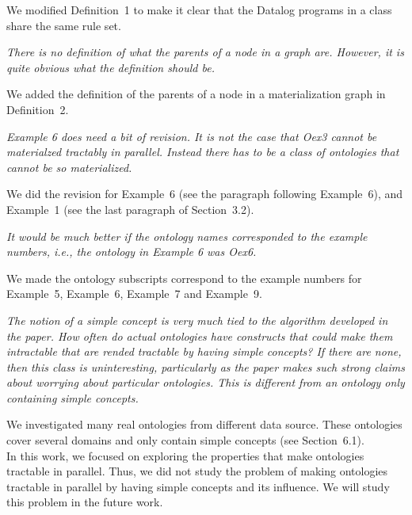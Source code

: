 \documentclass{article}
\let\quoteOld\quote
\let\endquoteOld\endquote
\renewenvironment{quote}{\quoteOld\itshape}{\endquoteOld}
\begin{document}
We modified Definition~1 to make it clear that the Datalog programs
in a class share the same rule set.

\begin{quote}
There is no definition of what the parents of a node in a graph are.
However, it is quite obvious what the definition should be.
\end{quote}

We added the definition of the parents of a node in a materialization graph in Definition~2.

\begin{quote}
Example 6 does need a bit of revision.  It is not the case that Oex3 cannot
be materialzed tractably in parallel.  Instead there has to be a class of
ontologies that cannot be so materialized.
\end{quote}

We did the revision for Example~6 (see the paragraph following Example~6),
and Example~1 (see the last paragraph of Section~3.2).


\begin{quote}
It would be much better if the ontology names corresponded to the example
numbers, i.e., the ontology in Example 6 was Oex6.
\end{quote}

We made the ontology subscripts correspond to the example numbers
for Example~5, Example~6, Example~7 and Example~9.


\begin{quote}
The notion of a simple concept is very much tied to the algorithm developed
in the paper.  How often do actual ontologies have constructs that could
make them intractable that are rended tractable by having simple concepts?
If there are none, then this class is uninteresting, particularly as the
paper makes such strong claims about worrying about particular ontologies.
This is different from an ontology only containing simple concepts.
\end{quote}


We investigated many real ontologies from different data source. These ontologies cover
several domains and only contain  simple concepts (see Section~6.1). \\

In this work, we focused on exploring the properties
that make ontologies tractable in parallel. Thus, we did not study the problem of making ontologies
tractable in parallel by having simple concepts and its influence. We will study this problem
in the future work.
\end{document}
